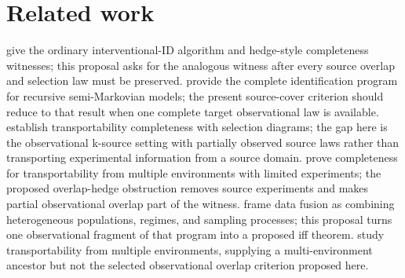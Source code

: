 \documentclass[11pt]{article}
\theoremstyle{definition}
\theoremstyle{plain}
\theoremstyle{remark}
\begin{document}
\section{Related work}
\citet{ShpitserPearl2006ID} give the ordinary interventional-ID algorithm and
hedge-style completeness witnesses; this proposal asks for the analogous
witness after every source overlap and selection law must be preserved.
\citet{ShpitserPearl2008CompleteID} provide the complete identification
program for recursive semi-Markovian models; the present source-cover
criterion should reduce to that result when one complete target observational
law is available.  \citet{BareinboimPearl2012TransportCompleteness} establish
transportability completeness with selection diagrams; the gap here is the
observational k-source setting with partially observed source laws rather than
transporting experimental information from a source domain.  \citet{BareinboimPearl2014MZTransport}
prove completeness for transportability from multiple environments with
limited experiments; the proposed overlap-hedge obstruction removes source
experiments and makes partial observational overlap part of the witness.
\citet{BareinboimPearl2016DataFusion} frame data fusion as combining
heterogeneous populations, regimes, and sampling processes; this proposal
turns one observational fragment of that program into a proposed iff theorem.
\citet{LeeHonavar2013MTransport} study transportability from multiple
environments, supplying a multi-environment ancestor but not the selected
observational overlap criterion proposed here.
\end{document}
